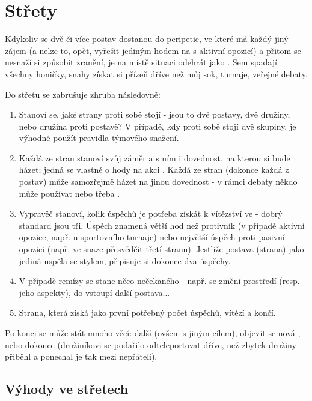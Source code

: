 \documentclass[../main.tex]{subfiles}
\begin{document}
\section{Střety}
\label{sec:strety}

Kdykoliv se dvě či více postav dostanou do peripetie, ve které má každý jiný zájem (a nelze to, opět, vyřešit jediným hodem na  s aktivní opozicí) a přitom se nesnaží si způsobit zranění, je na místě situaci odehrát jako . Sem spadají všechny honičky, snahy získat si přízeň dříve než můj sok, turnaje, veřejné debaty.

Do střetu se zabrušuje zhruba následovně:
\begin{enumerate}
\item Stanoví se, jaké strany proti sobě stojí - jsou to dvě postavy, dvě družiny, nebo družina proti postavě? V případě, kdy proti sobě stojí dvě skupiny, je výhodné použít pravidla týmového snažení.
\item Každá ze stran stanoví svůj záměr a s ním i dovednost, na kterou si bude házet; jedná se vlastně o hody na akci . Každá ze stran (dokonce každá z postav) může samozřejmě házet na jinou dovednost - v rámci debaty někdo může používat  nebo třeba . 

\item Vypravěč stanoví, kolik úspěchů je potřeba získát k vítězství ve  - dobrý standard jsou tři. Úspěch znamená větší hod než protivník (v případě aktivní opozice, např. u sportovního turnaje) nebo největší úspěch proti pasivní opozici (např. ve snaze přesvědčit třetí stranu). Jestliže postava (strana) jako jediná uspěla se stylem, připisuje si dokonce dva úspěchy.
\item V případě remízy se stane něco nečekaného - např. se změní prostředí (resp. jeho aspekty), do  vstoupí další postava...
\item Strana, která získá jako první potřebný počet úspěchů, vítězí a  končí.
\end{enumerate}

Po konci  se může stát mnoho věcí: další  (ovšem s jiným cílem), objevit se nová , nebo dokonce  (družiníkovi se podařilo odteleportovat dříve, než zbytek družiny přiběhl a ponechal je tak mezi nepřáteli).

\subsection{Výhody ve střetech}
\label{sec:výhody-střety}
\end{document}
